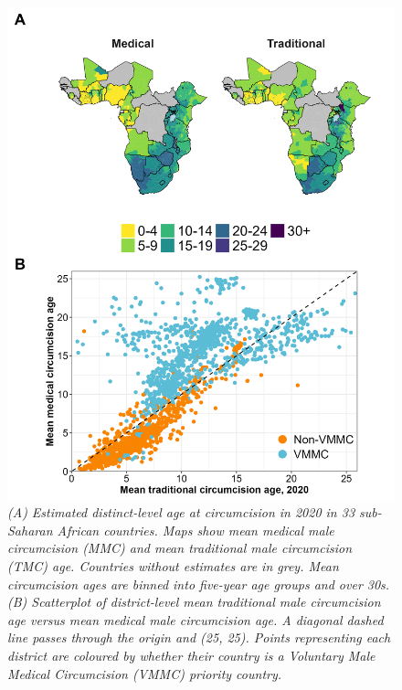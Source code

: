 \documentclass{article}
\begin{document}
\begin{figure}[H]
    \centering
    \includegraphics[width=.9\linewidth]
    {plots/05_map_plot_mean_circ_age.png}
    \caption{\emph{(A) Estimated distinct-level age at circumcision in 2020 in 33 sub-Saharan African countries. Maps show mean medical male circumcision (MMC) and mean traditional male circumcision (TMC) age. Countries without estimates are in grey. Mean circumcision ages are binned into five-year age groups and over 30s. (B) Scatterplot of district-level mean traditional male circumcision age versus mean medical male circumcision age. A diagonal dashed line passes through the origin and (25, 25). Points representing each district are coloured by whether their country is a Voluntary Male Medical Circumcision (VMMC) priority country.}}
\end{figure}

\end{document}
